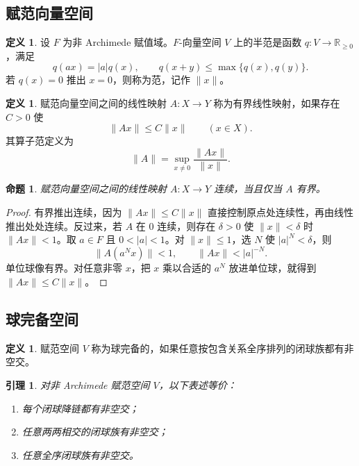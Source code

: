 \documentclass[11pt,a4paper,openany]{ctexbook}
\numberwithin{equation}{chapter}
\newcommand{\R}{\mathbb{R}}
\theoremstyle{plain}
\newtheorem{proposition}[theorem]{命题}
\newtheorem{lemma}[theorem]{引理}
\theoremstyle{definition}
\newtheorem{definition}[theorem]{定义}
\theoremstyle{remark}
\begin{document}
\subsection{赋范向量空间}

\begin{definition}
设 $F$ 为非 Archimede 赋值域。$F$-向量空间 $V$ 上的半范是函数 $q:V\to\R_{\ge0}$，满足
\[
  q(ax)=|a|q(x),\qquad q(x+y)\le \max\{q(x),q(y)\}.
\]
若 $q(x)=0$ 推出 $x=0$，则称为范，记作 $\|x\|$。
\end{definition}

\begin{definition}
赋范向量空间之间的线性映射 $A:X\to Y$ 称为有界线性映射，如果存在 $C>0$ 使
\[
  \|Ax\|\le C\|x\|\qquad(x\in X).
\]
其算子范定义为
\[
  \|A\|=\sup_{x\ne0}\frac{\|Ax\|}{\|x\|}.
\]
\end{definition}

\begin{proposition}
赋范向量空间之间的线性映射 $A:X\to Y$ 连续，当且仅当 $A$ 有界。
\end{proposition}

\begin{proof}
有界推出连续，因为 $\|Ax\|\le C\|x\|$ 直接控制原点处连续性，再由线性推出处处连续。反过来，若 $A$ 在 $0$ 连续，则存在 $\delta>0$ 使 $\|x\|<\delta$ 时 $\|Ax\|<1$。取 $a\in F$ 且 $0<|a|<1$。对 $\|x\|\le1$，选 $N$ 使 $|a|^N<\delta$，则
\[
  \|A(a^Nx)\|<1,\qquad \|Ax\|<|a|^{-N}.
\]
单位球像有界。对任意非零 $x$，把 $x$ 乘以合适的 $a^N$ 放进单位球，就得到 $\|Ax\|\le C\|x\|$。
\end{proof}

\subsection{球完备空间}

\begin{definition}
赋范空间 $V$ 称为球完备的，如果任意按包含关系全序排列的闭球族都有非空交。
\end{definition}

\begin{lemma}
对非 Archimede 赋范空间 $V$，以下表述等价：
\begin{enumerate}[label=(\arabic*)]
\item 每个闭球降链都有非空交；
\item 任意两两相交的闭球族有非空交；
\item 任意全序闭球族有非空交。
\end{enumerate}
\end{lemma}
\end{document}
